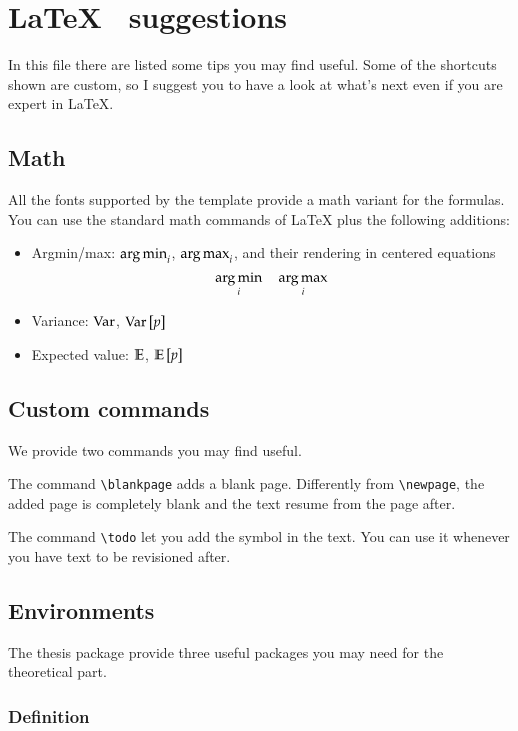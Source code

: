 \chapter*{\LaTeX~ suggestions}

\begin{center}
\bfseries 
\color{red}{REMOVE THIS CHAPTER BEFORE SUBMISSION}
\end{center}

\noindent In this file there are listed some tips you may find useful. Some of the shortcuts shown are custom, so I suggest you to have a look at what's next even if you are expert in LaTeX.

\section*{Math}

All the fonts supported by the template provide a math variant for the formulas. You can use the standard math commands of LaTeX plus the following additions:
\begin{itemize}
\item Argmin/max: $\operatorname*{arg\,min}_i$, $\operatorname*{arg\,max}_i$, and their rendering in centered equations
$$\operatorname*{arg\,min}_i \quad \operatorname*{arg\,max}_i$$
\item Variance: $\operatorname*{Var}$, $\operatorname*{Var}\left[ {p} \right]$
\item Expected value: $\operatorname*{\mathbb{E}}$, $\operatorname*{\mathbb{E}}\left[ {p} \right]$
\end{itemize}

\section*{Custom commands}

We provide two commands you may find useful.

The command \texttt{\textbackslash blankpage} adds a blank page. Differently from \texttt{\textbackslash newpage}, the added page is completely blank and the text resume from the page after.

The command \texttt{\textbackslash todo} let you add the \todo symbol in the text. You can use it whenever you have text to be revisioned after.

\section*{Environments}

The thesis package provide three useful packages you may need for the theoretical part.

\subsection*{Definition}

